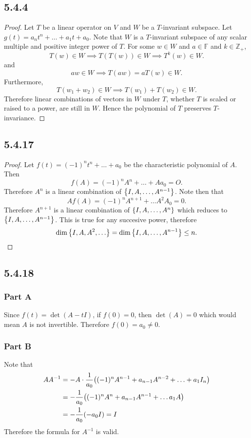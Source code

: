 \documentclass[12pt,titlepage]{extarticle}
\begin{document}
\subsection*{5.4.4}
\begin{proof}
    Let $T$ be a linear operator on $V$ and $W$ be a $T$-invariant subspace. Let $g(t) = a_n t^n + \ldots + a_1 t + a_0$. Note that $W$ is a $T$-invariant subspace of any scalar multiple and positive integer power of $T$. For some $w \in W$ and $a \in \mathbb{F}$ and $k \in \mathbb{Z}_{+}$,
    \[
        T(w) \in W \implies T(T(w)) \in W \implies T^k(w) \in W
    .\]
    and
    \[
        aw \in W \implies T(aw) = aT(w) \in W
    .\]
    Furthermore,
    \[
        T(w_1 + w_2) \in W \implies T(w_1) + T(w_2) \in W
    .\]
    Therefore linear combinations of vectors in $W$ under $T$, whether $T$ is scaled or raised to a power, are still in $W$. Hence the polynomial of $T$ preserves $T$-invariance.
\end{proof}

\subsection*{5.4.17}
\begin{proof}
    Let $f(t) = (-1)^n t^n + \ldots + a_0$ be the characteristic polynomial of $A$. Then
    \[
        f(A) = (-1)^n A^n + \ldots + A a_0 = O
    .\]
    Therefore $A^n$ is a linear combination of $\qty{I, A, \ldots, A^{n-1}}$. Note then that
    \[
        A f(A) = (-1)^n A^{n+1} + \ldots A^2 A_0 = 0
    .\]
    Therefore $A^{n+1}$ is a linear combination of $\qty{I, A, \ldots, A^n}$ which reduces to $\qty{I, A, \ldots, A^{n-1}}$. This is true for any succesive power, therefore
    \[
        \dim\qty{I, A, A^2, \ldots} = \dim\qty{I, A, \ldots, A^{n-1}} \leq n
    .\]
\end{proof}

\subsection*{5.4.18}
\subsubsection*{Part A}
Since $f(t) = \det(A - tI)$, if $f(0) = 0$, then $\det(A) = 0$ which would mean $A$ is not invertible. Therefore $f(0) = a_0 \neq 0$.

\subsubsection*{Part B}
Note that
\begin{align*}
    A A^{-1} &= -A \cdot \frac{1}{a_0} \qty(
    (-1)^n A^{n-1} + a_{n-1} A^{n-2} + \ldots + a_1 I_n
    ) \\
             &= -\frac{1}{a_0} \qty((-1)^n A^n + a_{n-1} A^{n-1} + \ldots a_1 A) \\
             &= -\frac{1}{a_0} \qty(-a_0 I) = I
\end{align*}
Therefore the formula for $A^{-1}$ is valid.
\end{document}
